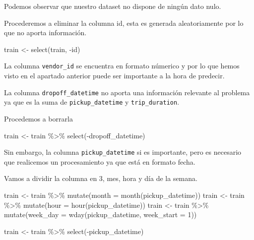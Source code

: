 \documentclass[
]{article}
\newenvironment{Shaded}{\begin{snugshade}}{\end{snugshade}}
\newcommand{\AttributeTok}[1]{\textcolor[rgb]{0.77,0.63,0.00}{#1}}
\newcommand{\DecValTok}[1]{\textcolor[rgb]{0.00,0.00,0.81}{#1}}
\newcommand{\FunctionTok}[1]{\textcolor[rgb]{0.00,0.00,0.00}{#1}}
\newcommand{\NormalTok}[1]{#1}
\newcommand{\OtherTok}[1]{\textcolor[rgb]{0.56,0.35,0.01}{#1}}
\newcommand{\SpecialCharTok}[1]{\textcolor[rgb]{0.00,0.00,0.00}{#1}}
\begin{document}
Podemos observar que nuestro dataset no dispone de ningún dato nulo.

Procederemos a eliminar la columna id, esta es generada aleatoriamente
por lo que no aporta información.

\begin{Shaded}
\begin{Highlighting}[]
\NormalTok{train }\OtherTok{\textless{}{-}} \FunctionTok{select}\NormalTok{(train, }\SpecialCharTok{{-}}\NormalTok{id)}
\end{Highlighting}
\end{Shaded}

La columna \texttt{vendor\_id} se encuentra en formato númerico y por lo
que hemos visto en el apartado anterior puede ser importante a la hora
de predecir.

La columna \texttt{dropoff\_datetime} no aporta una información
relevante al problema ya que es la suma de \texttt{pickup\_datetime} y
\texttt{trip\_duration}.

Procedemos a borrarla

\begin{Shaded}
\begin{Highlighting}[]
\NormalTok{train }\OtherTok{\textless{}{-}}\NormalTok{ train }\SpecialCharTok{\%\textgreater{}\%} \FunctionTok{select}\NormalTok{(}\SpecialCharTok{{-}}\NormalTok{dropoff\_datetime)}
\end{Highlighting}
\end{Shaded}

Sin embargo, la columna \texttt{pickup\_datetime} si es importante, pero
es necesario que realicemos un procesamiento ya que está en formato
fecha.

Vamos a dividir la columna en 3, mes, hora y día de la semana.

\begin{Shaded}
\begin{Highlighting}[]
\NormalTok{train }\OtherTok{\textless{}{-}}\NormalTok{ train }\SpecialCharTok{\%\textgreater{}\%} \FunctionTok{mutate}\NormalTok{(}\AttributeTok{month =} \FunctionTok{month}\NormalTok{(pickup\_datetime))}
\NormalTok{train }\OtherTok{\textless{}{-}}\NormalTok{ train }\SpecialCharTok{\%\textgreater{}\%} \FunctionTok{mutate}\NormalTok{(}\AttributeTok{hour =} \FunctionTok{hour}\NormalTok{(pickup\_datetime))}
\NormalTok{train }\OtherTok{\textless{}{-}}\NormalTok{ train }\SpecialCharTok{\%\textgreater{}\%} \FunctionTok{mutate}\NormalTok{(}\AttributeTok{week\_day =} \FunctionTok{wday}\NormalTok{(pickup\_datetime, }\AttributeTok{week\_start =} \DecValTok{1}\NormalTok{))}

\NormalTok{train }\OtherTok{\textless{}{-}}\NormalTok{ train }\SpecialCharTok{\%\textgreater{}\%} \FunctionTok{select}\NormalTok{(}\SpecialCharTok{{-}}\NormalTok{pickup\_datetime)}
\end{Highlighting}
\end{Shaded}
\end{document}
